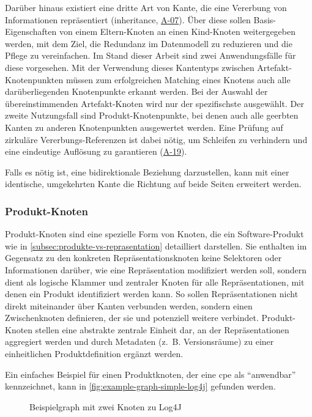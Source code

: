 Darüber hinaus existiert eine dritte Art von Kante, die eine Vererbung von Informationen repräsentiert (inheritance, \hyperref[subsec:req-selektor-inheritance]{A-07}).
Über diese sollen Basis-Eigenschaften von einem Eltern-Knoten an einen Kind-Knoten weitergegeben werden, mit dem Ziel, die Redundanz im Datenmodell zu reduzieren und die Pflege zu vereinfachen.
Im Stand dieser Arbeit sind zwei Anwendungsfälle für diese vorgesehen.
Mit der Verwendung dieses Kantentyps zwischen Artefakt-Knotenpunkten müssen zum erfolgreichen Matching eines Knotens auch alle darüberliegenden Knotenpunkte erkannt werden.
Bei der Auswahl der übereinstimmenden Artefakt-Knoten wird nur der spezifischste ausgewählt.
Der zweite Nutzungsfall sind Produkt-Knotenpunkte, bei denen auch alle geerbten Kanten zu anderen Knotenpunkten ausgewertet werden.
Eine Prüfung auf zirkuläre Vererbungs-Referenzen ist dabei nötig, um Schleifen zu verhindern und eine eindeutige Auflösung zu garantieren (\hyperref[subsec:req-graph-inner-consistency]{A-19}).

Falls es nötig ist, eine bidirektionale Beziehung darzustellen, kann mit einer identische, umgekehrten Kante die Richtung auf beide Seiten erweitert werden.

\subsubsection{Produkt-Knoten}\label{subsubsec:model-product-node}
Produkt-Knoten sind eine spezielle Form von Knoten, die ein Software-Produkt wie in \autoref{subsec:produkte-vs-reprasentation} detailliert darstellen.
Sie enthalten im Gegensatz zu den konkreten Repräsentationsknoten keine Selektoren oder Informationen darüber, wie eine Repräsentation modifiziert werden soll, sondern dient als logische Klammer und zentraler Knoten für alle Repräsentationen, mit denen ein Produkt identifiziert werden kann.
So sollen Repräsentationen nicht direkt miteinander über Kanten verbunden werden, sondern einen Zwischenknoten definieren, der sie und potenziell weitere verbindet.
Produkt-Knoten stellen eine abstrakte zentrale Einheit dar, an der Repräsentationen aggregiert werden und durch Metadaten (z.\ B. Versionsräume) zu einer einheitlichen Produktdefinition ergänzt werden.

Ein einfaches Beispiel für einen Produktknoten, der eine \acrshort{cpe} als \enquote{anwendbar} kennzeichnet, kann in \autoref{fig:example-graph-simple-log4j} gefunden werden.

\begin{figure}[htbp]
    \centering
    \makebox[\textwidth]{}
    \caption{Beispielgraph mit zwei Knoten zu Log4J}
    \label{fig:example-graph-simple-log4j}
\end{figure}

